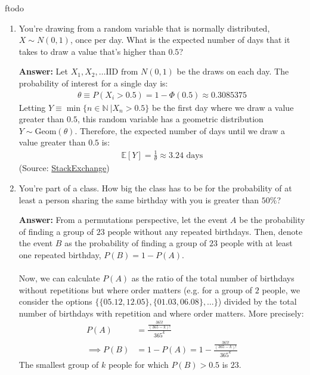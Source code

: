 ƒtodo\documentclass{article}
\newenvironment{QandA}{\begin{enumerate}[label=\arabic*.]}{\end{enumerate}}
\newenvironment{answer}{\par\normalfont \textbf{Answer:}}{}
\newcommand{\N}{\mathbb{N}}
\newcommand{\Exp}[1]{\mathbb{E}\left[ #1 \right]}
\newcommand{\g}{\vert}
\begin{document}
\begin{QandA}
    \item You're drawing from a random variable that is normally distributed, $X \sim N(0, 1)$, once per day. What is the expected number of days that it takes to draw a value that's higher than $0.5$?
    \begin{answer}
        Let $X_1, X_2, \ldots \text{IID from } N(0, 1)$ be the draws on each day. The probability of interest for a single day is:
        \begin{align*}
            \theta \equiv P(X_i > 0.5) = 1 - \Phi(0.5) \approx 0.3085375
        \end{align*}
        Letting $Y \equiv \min \{ n \in \N\ \g X_n > 0.5\}$ be the first day where we draw a value greater than $0.5$, this random variable has a geometric distribution $Y \sim \text{Geom}(\theta)$. Therefore, the expected number of days until we draw a value greater than $0.5$ is:
        \begin{align*}
            \Exp{Y} = \frac{1}{\theta} \approx 3.24 \text{ days}
        \end{align*}
        (Source: \href{https://stats.stackexchange.com/questions/410929/expected-number-of-days}{StackExchange})
    \end{answer}
    \item You’re part of a class. How big the class has to be for the probability of at least a person sharing the same birthday with you is greater than $50\%$?
    \begin{answer}
        From a permutations perspective, let the event $A$ be the probability of finding a group of $23$ people without any repeated birthdays. Then, denote the event $B$ as the probability of finding a group of $23$ people with at least one repeated birthday, $P(B) = 1 -P(A)$. \\\\
        Now, we can calculate $P(A)$ as the ratio of the total number of birthdays without repetitions but where order matters (e.g. for a group of $2$ people, we consider the options $\{ \{05.12, 12.05\}, \{01.03, 06.08 \}, \ldots \}$) divided by the total number of birthdays with repetition and where order matters. More precisely:
        \begin{align*}
            P(A) &= \frac{\frac{365!}{(365-k)!}}{365^k} \\
            \implies P(B) &= 1 - P(A) = 1 - \frac{\frac{365!}{(365-k)!}}{365^k}
        \end{align*}
        The smallest group of $k$ people for which $P(B) > 0.5$ is $23$.


\end{answer}
\end{QandA}
\end{document}

